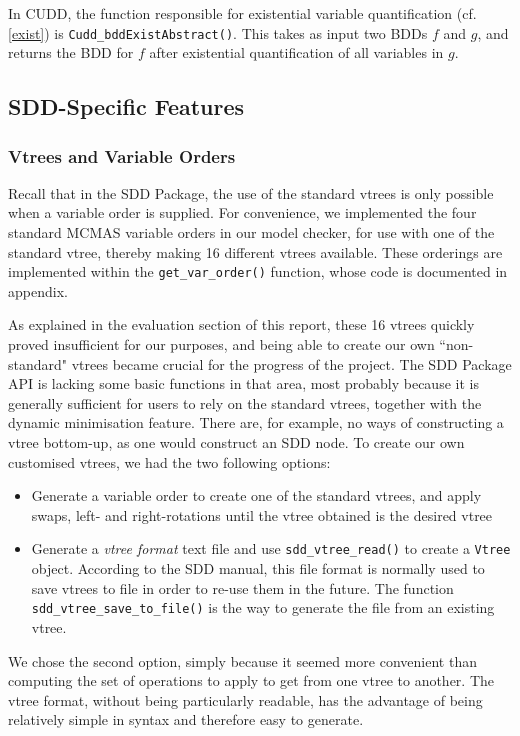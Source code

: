 \documentclass[11pt]{article}
\begin{document}
In CUDD, the function responsible for existential variable quantification (cf. \ref{exist}) is \texttt{Cudd\_bddExistAbstract()}. This takes as input two BDDs $f$ and $g$, and returns the BDD for $f$ after existential quantification of all variables in $g$. 


\subsection{SDD-Specific Features}

\subsubsection{Vtrees and Variable Orders}

Recall that in the SDD Package, the use of the standard vtrees is only possible when a variable order is supplied. For convenience, we implemented the four standard MCMAS variable orders in our model checker, for use with one of the standard vtree, thereby making 16 different vtrees available. These orderings are implemented within the \texttt{get\_var\_order()} function, whose code is documented in appendix. 

As explained in the evaluation section of this report, these 16 vtrees quickly proved insufficient for our purposes, and being able to create our own ``non-standard" vtrees became crucial for the progress of the project.  
The SDD Package API is lacking some basic functions in that area, most probably because it is generally sufficient for users to rely on the standard vtrees, together with the dynamic minimisation feature. There are, for example, no ways of constructing a vtree bottom-up, as one would construct an SDD node. To create our own customised vtrees, we had the two following options:
\begin{itemize}
\item Generate a variable order to create one of the standard vtrees, and apply swaps, left- and right-rotations until the vtree obtained is the desired vtree
\item Generate a \textit{vtree format} text file and use \texttt{sdd\_vtree\_read()} to create a \texttt{Vtree} object. According to the SDD manual, this file format is normally used to save vtrees to file in order to re-use them in the future. The function \texttt{sdd\_vtree\_save\_to\_file()} is the way to generate the file from an existing vtree.

\end{itemize}
We chose the second option, simply because it seemed more convenient than computing the set of operations to apply to get from one vtree to another. The vtree format, without being particularly readable, has the advantage of being relatively simple in syntax and therefore easy to generate. 
\end{document}
